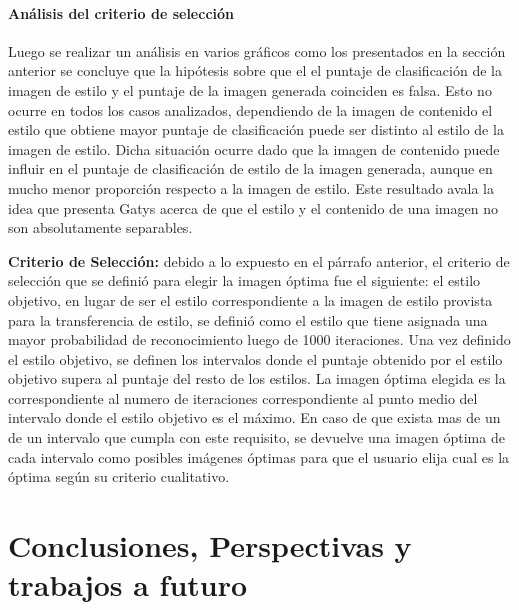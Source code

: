 \documentclass[a4paper,11pt,spanish]{book}
\begin{document}
    \subsubsection{Análisis del criterio de selección} \label{sec:criterio}
      Luego se realizar un análisis en varios gráficos como los presentados en la sección anterior se concluye que la hipótesis sobre que el el puntaje de clasificación de la imagen
      de estilo y el puntaje de la imagen generada coinciden es falsa. Esto no ocurre en todos los casos analizados, dependiendo de la imagen de contenido el estilo
      que obtiene mayor puntaje de clasificación puede ser distinto al estilo de la imagen de estilo. 
      Dicha situación ocurre dado que la imagen de contenido puede influir en el puntaje de clasificación de estilo
      de la imagen generada, aunque en mucho menor proporción respecto a la imagen de estilo. Este resultado avala la idea que presenta Gatys acerca de que el estilo y el contenido de una
      imagen no son absolutamente separables.
      
      \textbf{Criterio de Selección:} debido a lo expuesto en el párrafo anterior, el criterio de selección que se definió para elegir la imagen óptima fue el siguiente: el estilo objetivo, en lugar de ser el estilo correspondiente a la imagen de estilo
      provista para la transferencia de estilo, se definió como el estilo que tiene asignada una mayor probabilidad de reconocimiento luego de 1000 iteraciones. 
      Una vez definido el estilo objetivo, se definen los intervalos donde el puntaje obtenido por el estilo objetivo
      supera al puntaje del resto de los estilos. La imagen óptima elegida es la correspondiente al numero de iteraciones correspondiente al punto medio del intervalo 
      donde el estilo objetivo es el máximo. 
      En caso de que exista mas de un de un intervalo que cumpla con este requisito, se devuelve una imagen óptima de cada intervalo como posibles imágenes óptimas 
      para que el usuario elija cual es la óptima según su criterio cualitativo.


\chapter{Conclusiones, Perspectivas y trabajos a futuro} \label{chap:conclusiones}
\end{document}
